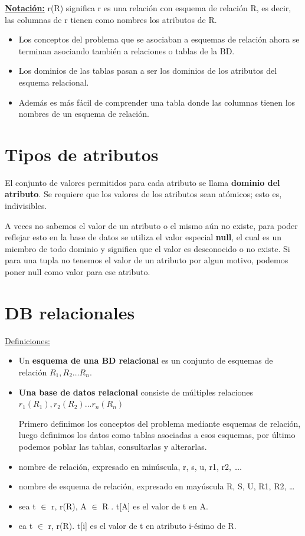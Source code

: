 \documentclass[12pt,a4paper]{report}
\begin{document}
			\vspace{5mm}
			\par \underline{\textbf{Notación:}} r(R) significa r es una relación con esquema de relación R, es decir, las columnas de r tienen como nombres los atributos de R.
			\begin{itemize}
				\item Los conceptos del problema que se asociaban a esquemas de relación ahora se terminan asociando también a relaciones o tablas de la BD.
				\item Los dominios de las tablas pasan a ser los dominios de los atributos del esquema relacional.
				\item Además es más fácil de comprender una tabla donde las columnas tienen los nombres de un esquema de relación.
			\end{itemize}

	\section{Tipos de atributos}
		\par El conjunto de valores permitidos para cada atributo se llama \textbf{dominio del atributo}. Se requiere que los valores de los atributos sean atómicos; esto es, indivisibles.

		\par A veces no sabemos el valor de un atributo o el mismo aún no existe, para poder reflejar esto en la base de datos se utiliza el valor especial \textbf{null}, el cual es un miembro de todo dominio y significa que el valor es desconocido o no existe. Si para una tupla no tenemos el valor de un atributo por algun motivo, podemos poner null como valor para ese atributo.
	
	\section{DB relacionales}
		\underline{Definiciones:}
		\begin{itemize}
			\item Un \textbf{esquema de una BD relacional} es un conjunto de esquemas de relación $R_{1}, R_{2} \dotsc R_{n}$.
			\item \textbf{Una base de datos relacional} consiste de múltiples relaciones $r_{1}(R_{1}), r_{2}(R_{2}) \dotsc r_{n}(R_{n})$
			\par Primero definimos los conceptos del problema mediante esquemas de relación, luego definimos los datos como tablas asociadas a esos esquemas, por último podemos poblar las tablas, consultarlas y alterarlas.
			\item nombre de relación, expresado en minúscula, r, s, u, r1, r2, ….
			\item nombre de esquema de relación, expresado en mayúscula R, S, U, R1, R2, …
			\item sea t $\in$ r, r(R), A $\in$ R . t[A] es el valor de t en A.
			\item ea t $\in$ r, r(R). t[i] es el valor de t en atributo i-ésimo de R.
		\end{itemize}
\end{document}
